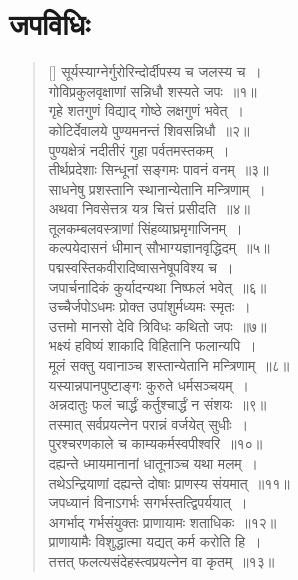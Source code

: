 \documentclass[twoside,12pt,notitlepage]{book}
\begin{document}
\section{जपविधिः}
\begin{verse}[\versewidth]	
सूर्यस्याग्नेर्गुरोरिन्दोर्दीपस्य च जलस्य च~।\\[-6pt]
	गोविप्रकुलवृक्षाणां सन्निधौ शस्यते जपः~॥१॥\\
	गृहे शतगुणं विद्याद् गोष्ठे लक्षगुणं भवेत्~।\\[-6pt]
	कोटिर्देवालये पुण्यमनन्तं शिवसन्निधौ~॥२॥\\
		पुण्यक्षेत्रं नदीतीरं गुहा पर्वतमस्तकम्~।\\[-6pt]
		तीर्थप्रदेशाः सिन्धूनां सङ्गमः पावनं वनम्~॥३॥\\
		साधनेषु प्रशस्तानि स्थानान्येतानि मन्त्रिणाम्~।\\[-6pt]
		अथवा निवसेत्तत्र यत्र चित्तं प्रसीदति~॥४॥\\
			तूलकम्बलवस्त्राणां सिंहव्याघ्रमृगाजिनम्~।\\[-6pt]
	कल्पयेदासनं धीमान् सौभाग्यज्ञानवृद्धिदम्~॥५॥\\
	पद्मस्वस्तिकवीरादिष्वासनेषूपविश्य च~।\\[-6pt]
	जपार्चनादिकं कुर्यादन्यथा निष्फलं भवेत्~॥६॥\\
	उच्चैर्जपोऽधमः प्रोक्त उपांशुर्मध्यमः स्मृतः~।\\[-6pt]
	उत्तमो मानसो देवि त्रिविधः कथितो जपः~॥७॥\\
	भक्ष्यं हविष्यं शाकादि विहितानि फलान्यपि~।\\[-6pt]
	मूलं सक्तु यवानाञ्च शस्तान्येतानि मन्त्रिणाम्~॥८॥\footA \\
	यस्यान्नपानपुष्टाङ्गः कुरुते धर्मसञ्चयम्~।\\[-6pt]
	अन्नदातुः फलं चार्द्धं कर्तुश्चार्द्धं न संशयः~॥९॥\\
	तस्मात् सर्वप्रयत्नेन परान्नं वर्जयेत् सुधीः~।\\[-6pt]
	पुरश्चरणकाले च काम्यकर्मस्वपीश्वरि~॥१०॥\\
	दह्यन्ते ध्मायमानानां धातूनाञ्च यथा मलम्~।\\[-6pt]
	तथेऽन्द्रियाणां दह्यन्ते दोषाः प्राणस्य संयमात्~॥११॥ \\[-6pt]
	जपध्यानं विनाऽगर्भः सगर्भस्तत्द्विपर्ययात्~।\\[-6pt]
	अगर्भाद् गर्भसंयुक्तः प्राणायामः शताधिकः~॥१२॥\footA \\
	प्राणायामैः विशुद्धात्मा यद्यत् कर्म करोति हि~।\\[-6pt]
	तत्तत् फलत्यसंदेहस्त्वप्रयत्नेन वा कृतम्~॥१३॥\\

\end{verse}
\end{document}
